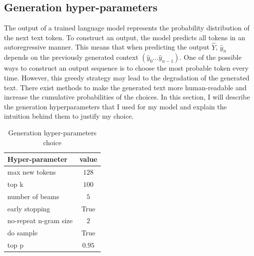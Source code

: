 \subsection{Generation hyper-parameters}
The output of a trained language model represents the probability distribution of the next text token. To construct an output, the model predicts all tokens in an autoregressive manner. This means that when predicting the output $\hat{Y}$, $\hat{y}_n$ depends on the previously generated context $(\hat{y}_0 \dots \hat{y}_{n-1})$. One of the possible ways to construct an output sequence is to choose the most probable token every time. However, this greedy strategy may lead to the degradation of the generated text. There exist methods to make the generated text more human-readable and increase the cumulative probabilities of the choices. In this section, I will describe the generation hyperparameters that I used for my model and explain the intuition behind them to justify my choice.

\begin{table}[h]
    \centering
    \caption{Generation hyper-parameters choice}\label{tab:gen_hyperparams}
    \renewcommand{\arraystretch}{1.5} %
    \begin{tabular}{| l | c |} %
    \hline %
    \textbf{Hyper-parameter} & \textbf{value} \\
    \hline %
    max new tokens & $128$ \\ \hline
    top k & $100$ \\ \hline
    number of beams & $5$ \\ \hline
    early stopping & True \\ \hline
    no-repeat n-gram size & $2$ \\ \hline
    do sample & True \\ \hline
    top p & $0.95$ \\ \hline 
    \end{tabular}
\end{table}

